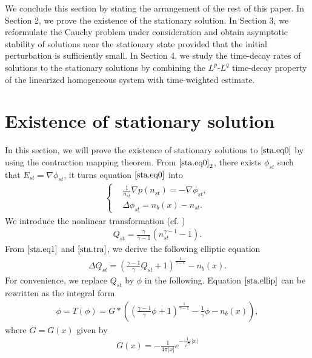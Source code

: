 \documentclass[11pt]{amsart}
\numberwithin{equation}{section}
\begin{document}
We conclude this section by stating the arrangement of the rest of
this paper. In Section 2, we prove the existence of the stationary
solution. In Section 3, we reformulate the Cauchy problem under
consideration and obtain asymptotic stability of solutions near the
stationary state provided that the initial perturbation is
sufficiently small. In Section 4, we study the time-decay rates of
solutions to the stationary solutions by combining the $L^p$-$L^q$
time-decay property of the linearized homogeneous system with
time-weighted estimate.

\vspace{5mm}

\section{Existence of stationary solution}\label{sec2}
In this section, we will prove the existence of stationary solutions
to $\eqref{sta.eq0}$ by using the contraction mapping theorem. From
$\eqref{sta.eq0}_2$, there exists $\phi_{st}$ such that
$E_{st}=\nabla \phi_{st}$, it turns equation $\eqref{sta.eq0}$ into
\begin{eqnarray}\label{sta.eq1}
\left\{\begin{aligned} &\frac{1}{n_{st}}\nabla
p(n_{st})=-\nabla\phi_{st},\\
&\Delta\phi_{st}=n_{b}(x)-n_{st}.
\end{aligned}\right.
\end{eqnarray}
We introduce the nonlinear transformation (cf. \cite{Deng})
\begin{eqnarray}\label{sta.tra}
Q_{st}=\frac{\gamma}{\gamma-1}(n_{st}^{\gamma-1}-1).
\end{eqnarray}
From $\eqref{sta.eq1}$ and $\eqref{sta.tra}$, we derive the
following elliptic equation
\begin{eqnarray}\label{sta.ellip}
\Delta
Q_{st}=\left(\frac{\gamma-1}{\gamma}Q_{st}+1\right)^{\frac{1}{\gamma-1}}-n_{b}(x).
\end{eqnarray}
For convenience, we replace $Q_{st}$ by $\phi$ in the following.
Equation $\eqref{sta.ellip}$ can be rewritten as the integral form
\begin{eqnarray*}
\phi=T(\phi)=G*\left(\left(\frac{\gamma-1}{\gamma}\phi+1\right)^{\frac{1}{\gamma-1}}-\frac{1}{\gamma}\phi
-n_{b}(x)\right),
\end{eqnarray*}
where $G=G(x)$ given by
\begin{eqnarray*}
G(x)=-\frac{1}{4\pi|x|}e^{-\tfrac{1}{\sqrt{\gamma}}|x|}
\end{eqnarray*}
\end{document}
